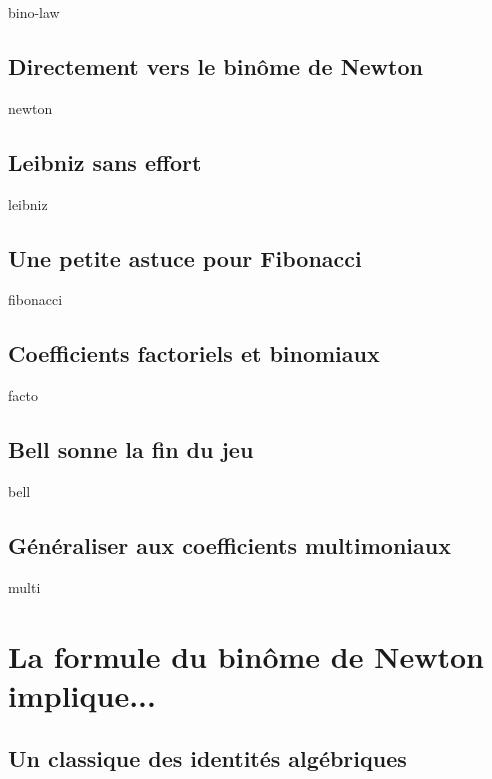 \documentclass[12pt]{amsart}
\begin{document}
    {bino-law}
    
    
    \subsection{Directement vers le binôme de Newton}
    
    {newton}
    
    
    \subsection{Leibniz sans effort}
    
    {leibniz}
    
    
    \subsection{Une petite astuce pour Fibonacci}
    
    {fibonacci}
    
    
    \subsection{Coefficients factoriels et binomiaux}
    
    {facto}
    
    
    \subsection{Bell sonne la fin du jeu}
    
    {bell}
    
    
\subsection{Généraliser aux coefficients multimoniaux}

{multi}




\section{La formule du binôme de Newton implique...}

    \subsection{Un classique des identités algébriques}
    
\end{document}
